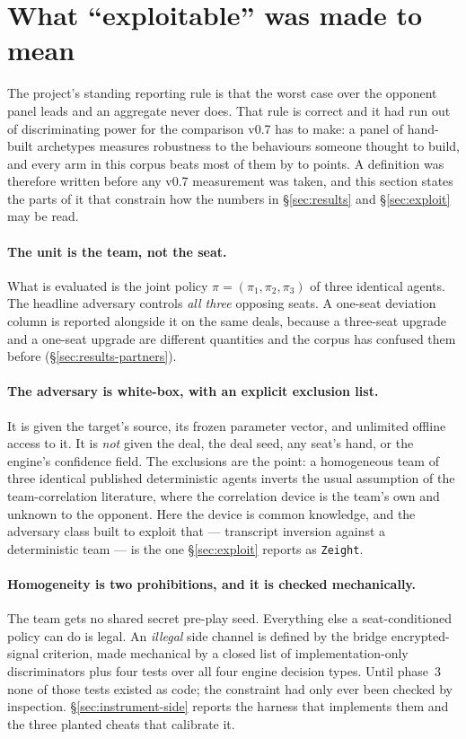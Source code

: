 \section{What ``exploitable'' was made to mean}
\label{sec:threat}

The project's standing reporting rule is that the worst case over the opponent panel leads and an
aggregate never does. That rule is correct and it had run out of discriminating power for the
comparison v0.7 has to make: a panel of hand-built archetypes measures robustness to the behaviours
someone thought to build, and every arm in this corpus beats most of them by
\vsevenFarSpanLo{} to \vsevenFarSpanHi{} points. A definition was therefore written before any v0.7 measurement was taken, and this section
states the parts of it that constrain how the numbers in \S\ref{sec:results} and \S\ref{sec:exploit}
may be read.

\paragraph{The unit is the team, not the seat.}
What is evaluated is the joint policy $\pi = (\pi_1,\pi_2,\pi_3)$ of three identical agents. The
headline adversary controls \emph{all three} opposing seats. A one-seat deviation column is reported
alongside it on the same deals, because a three-seat upgrade and a one-seat upgrade are different
quantities and the corpus has confused them before (\S\ref{sec:results-partners}).

\paragraph{The adversary is white-box, with an explicit exclusion list.}
It is given the target's source, its frozen parameter vector, and unlimited offline access to it. It
is \emph{not} given the deal, the deal seed, any seat's hand, or the engine's confidence field. The
exclusions are the point: a homogeneous team of three identical published deterministic agents
inverts the usual assumption of the team-correlation literature, where the correlation device is the
team's own and unknown to the opponent. Here the device is common knowledge, and the adversary class
built to exploit that --- transcript inversion against a deterministic team --- is the one
\S\ref{sec:exploit} reports as \texttt{Zeight}.

\paragraph{Homogeneity is two prohibitions, and it is checked mechanically.}
The team gets no shared secret pre-play seed. Everything else a seat-conditioned policy can do is
legal. An \emph{illegal} side channel is defined by the bridge encrypted-signal criterion, made
mechanical by a closed list of implementation-only discriminators plus four tests over all four engine
decision types. Until phase~3 none of those tests existed as code; the constraint had only ever been
checked by inspection. \S\ref{sec:instrument-side} reports the harness that implements them and the
three planted cheats that calibrate it.

